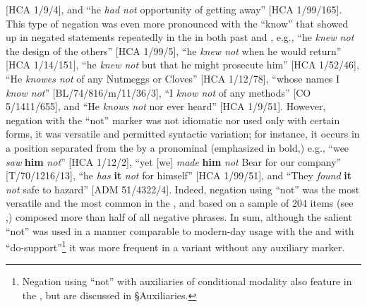 [HCA 1/9/4], and “he \textit{had not} opportunity of getting away” [HCA 1/99/165]. This type of negation was even more pronounced with the  “know” that showed up in negated statements repeatedly in the  in both past and , e.g., “he \textit{knew not} the design of the others” [HCA 1/99/5], “he \textit{knew not} when he would return” [HCA 1/14/151], “he \textit{knew not} but that he might prosecute him” [HCA 1/52/46], “He \textit{knowes not} of any Nutmeggs or Cloves” [HCA 1/12/78], “whose names I \textit{know not}” [BL/74/816/m/11/36/3], “I \textit{know not} of any methods” [CO 5/1411/655], and “He \textit{knows not} nor ever heard” [HCA 1/9/51]. However, negation with the “not” marker was not idiomatic nor used only with certain  forms, it was versatile and permitted syntactic variation; for instance, it occurs in a position separated from the  by a pronominal  (emphasized in bold,) e.g., “wee \textit{saw}\textbf{ }\textbf{him} \textit{not}” [HCA 1/12/2], “yet [we] \textit{made} \textbf{him} \textit{not} Bear for our company” [T/70/1216/13], “he \textit{has} \textbf{it} \textit{not} for himself” [HCA 1/99/51], and “They \textit{found} \textbf{it} \textit{not} safe to hazard” [ADM 51/4322/4]. Indeed, negation using “not” was the most versatile and the most common  in the , and based on a sample of 204 items (see ,) composed more than half of all negative  phrases. In sum, although the salient “not”  was used in a manner comparable to modern-day usage with the  and with “do-support”\footnote{Negation using “not” with auxiliaries of conditional modality also feature in the , but are discussed in §Auxiliaries.} it was more frequent in a variant  without any auxiliary marker.

